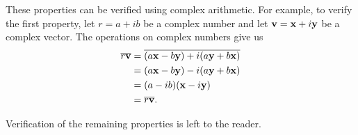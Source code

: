 These properties can be verified using complex arithmetic. For example, to verify the first property, let $r = a+ib$ be a complex number and let $\mathbf{v} = \mathbf{x} + i \mathbf{y}$ be a complex vector. The operations on complex numbers give us
\begin{align*}
\overline{r\mathbf{v}} &= \overline{(a\mathbf{x}-b\mathbf{y}) + i(a\mathbf{y} + b\mathbf{x})} \\
	&= (a\mathbf{x}-b\mathbf{y}) - i(a\mathbf{y} + b\mathbf{x}) \\
	&= (a-ib)(\mathbf{x} - i\mathbf{y}) \\
	&= \overline{r} \overline{\mathbf{v}}.
\end{align*}
	
Verification of the remaining properties is left to the reader. 






